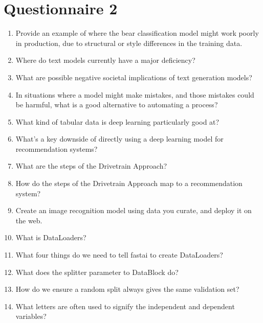 \documentclass[12pt,a4paper]{article}
\begin{document}
\raggedright

\section*{Questionnaire 2}

\begin{enumerate}
\item Provide an example of where the bear classification model might work poorly in production, due to structural or style differences in the training data. \\
\item Where do text models currently have a major deficiency? \\
\item What are possible negative societal implications of text generation models? \\
\item In situations where a model might make mistakes, and those mistakes could be harmful, what is a good alternative to automating a process? \\
\item What kind of tabular data is deep learning particularly good at? \\
\item What's a key downside of directly using a deep learning model for recommendation systems? \\
\item What are the steps of the Drivetrain Approach? \\
\item How do the steps of the Drivetrain Approach map to a recommendation system? \\
\item Create an image recognition model using data you curate, and deploy it on the web. \\
\item What is DataLoaders? \\
\item What four things do we need to tell fastai to create DataLoaders? \\
\item What does the splitter parameter to DataBlock do? \\
\item How do we ensure a random split always gives the same validation set? \\
\item What letters are often used to signify the independent and dependent variables? \\

\end{enumerate}
\end{document}
